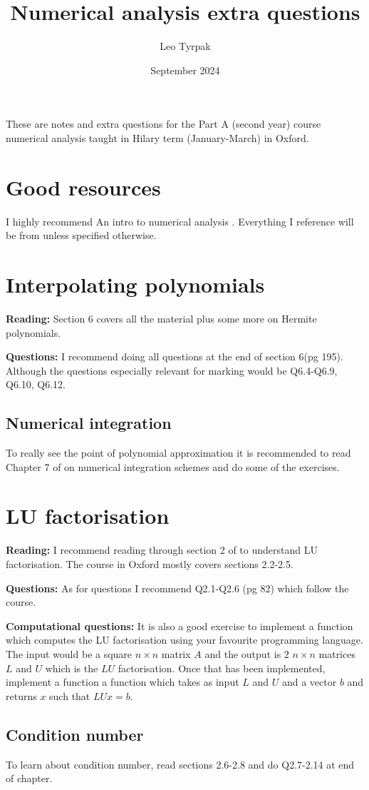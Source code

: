 \documentclass{article}
\title{Numerical analysis extra questions}
\author{Leo Tyrpak}
\date{September 2024}
\begin{document}
\maketitle
These are notes and extra questions for the Part A (second year) course numerical analysis taught in Hilary term (January-March) in Oxford.
\section{Good resources}
I highly recommend An intro to numerical analysis \cite{NAbook}.
Everything I reference will be from \cite{NAbook} unless specified otherwise.
\section{Interpolating polynomials}
\textbf{Reading: }Section 6 covers all the material plus some more on Hermite polynomials.

\textbf{Questions: }I recommend doing all questions at the end of section 6(pg 195).
Although the questions especially relevant for marking would be Q6.4-Q6.9, Q6.10, Q6.12.

\subsection{Numerical integration}
To really see the point of polynomial approximation it is recommended to read Chapter 7 of \cite{NAbook} on numerical integration schemes and do some of the exercises.

\section{LU factorisation}
\textbf{Reading: }I recommend reading through section 2 of \cite{NAbook} to understand LU factorisation.
The course in Oxford mostly covers sections 2.2-2.5.

\textbf{Questions: }As for questions I recommend Q2.1-Q2.6 (pg 82) which follow the course.

\textbf{Computational questions: }It is also a good exercise to implement a function which computes the LU factorisation using your favourite programming language. 
The input would be a square $n\times n$ matrix $A$ and the output is $2$ $n\times n$ matrices $L$ and $U$ which is the $LU$ factorisation.
Once that has been implemented, implement a function a function which takes as input $L$ and $U$ and a vector $b$ and returns $x$ such that $LUx=b$.
\subsection{Condition number}
To learn about condition number, read sections 2.6-2.8 and do Q2.7-2.14 at end of chapter.

\sec


\end{document}
